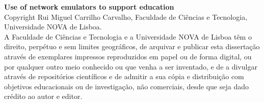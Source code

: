 
\mbox{}
\vfill
\noindent\textbf{Use of network emulators to support education}\\

\noindent Copyright \textcopyright\xspace Rui Miguel Carrilho Carvalho, Faculdade de Ciências e Tecnologia, Universidade NOVA de Lisboa.\\
A Faculdade de Ciências e Tecnologia e a Universidade NOVA de Lisboa têm o direito, perpétuo e sem limites geográficos, de arquivar e publicar esta dissertação através de exemplares impressos reproduzidos em papel ou de forma digital, ou por qualquer outro meio conhecido ou que venha a ser inventado, e de a divulgar através de repositórios científicos e de admitir a sua cópia e distribuição com objetivos educacionais ou de investigação, não comerciais, desde que seja dado crédito ao autor e editor.

